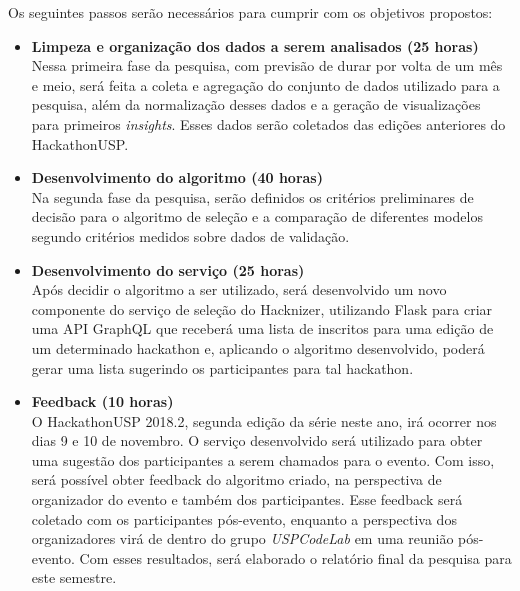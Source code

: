 \documentclass[10pt,twoside,a4paper]{article}
\begin{document}
  Os seguintes passos serão necessários para cumprir com os objetivos propostos:

  \begin{itemize}
    \item \textbf{Limpeza e organização dos dados a serem analisados (25 horas)} \\
        Nessa primeira fase da pesquisa, com previsão de durar por volta de um mês e meio, será feita a coleta e agregação do conjunto de dados utilizado para a pesquisa, além da normalização desses dados e a geração de visualizações para primeiros \textit{insights}. Esses dados serão coletados das edições anteriores do HackathonUSP.
    
    \item \textbf{Desenvolvimento do algoritmo (40 horas)} \\
        Na segunda fase da pesquisa, serão definidos os critérios preliminares de decisão para o algoritmo de seleção e a comparação de diferentes modelos segundo critérios medidos sobre dados de validação.
          
    \item \textbf{Desenvolvimento do serviço (25 horas)} \\
        Após decidir o algoritmo a ser utilizado, será desenvolvido um novo componente do serviço de seleção do Hacknizer, utilizando Flask para criar uma API GraphQL  que receberá uma lista de inscritos para uma edição de um determinado hackathon e, aplicando o algoritmo desenvolvido, poderá gerar uma lista sugerindo os participantes para tal hackathon. 
    
    \item \textbf{Feedback (10 horas)} \\
        O HackathonUSP 2018.2, segunda edição da série neste ano, irá ocorrer nos dias 9 e 10 de novembro. O serviço desenvolvido será utilizado para obter uma sugestão dos participantes a serem chamados para o evento. Com isso, será possível obter feedback do algoritmo criado, na perspectiva de organizador do evento e também dos participantes. Esse feedback será coletado com os participantes pós-evento, enquanto a perspectiva dos organizadores virá de dentro do grupo \textit{USPCodeLab} em uma reunião pós-evento. Com esses resultados, será elaborado o relatório final da pesquisa para este semestre.

  \end{itemize}
  
\end{document}
